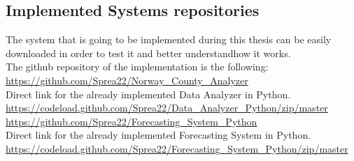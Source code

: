

\hypersetup{
    colorlinks=true,
    linkcolor=blue,
    filecolor=magenta,      
    urlcolor=blue,
}




\subsection{Implemented Systems repositories}
The system that is going to be implemented during this thesis can be easily downloaded in order to test it and better understandhow it works.\\
The github repository of the implementation is the following:\\
\url{https://github.com/Sprea22/Norway_County_Analyzer}\\
Direct link for the already implemented Data Analyzer in Python.\\
\url{https://codeload.github.com/Sprea22/Data_Analyzer_Python/zip/master}\\

\url{https://github.com/Sprea22/Forecasting_System_Python}\\
Direct link for the already implemented Forecasting System in Python.\\
\url{https://codeload.github.com/Sprea22/Forecasting_System_Python/zip/master}





	